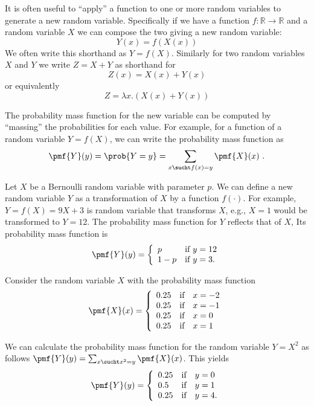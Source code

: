 \begin{flex}
\label{grp:grm:probability::randvar::often}

\begin{gram}
\label{grm:probability::randvar::often}
    It is often useful to ``apply'' a function to one or more random
    variables to generate a new random variable.   Specifically if we
    have a
    function $f : \mathbb{R} \rightarrow \mathbb{R}$ and
    a random variable $X$ we can compose the two giving a new
    random variable:
    \[Y(x) = f(X(x)) \]
    We often write this shorthand as $Y = f(X)$.
    Similarly for two random variables $X$ and $Y$
    we write $Z = X + Y$ as shorthand for 
        \[Z(x) = X(x) + Y(x) \]
    or equivalently
        \[Z = \lambda x . (X(x) + Y(x)) \]

The probability mass function for the new variable can be computed by
``massing'' the probabilities for each value.
For example, for a function of a random variable $Y = f(X)$, we can
write the probability mass function as 
\[
\pmf{Y}(y) = \prob{Y = y} = \sum_{x \sucht f(x) = y}{\pmf{X}(x)}~.
\]

\end{gram}

\begin{example}
\label{xmpl:probability::randvar::bernoulli}
Let $X$ be a Bernoulli random variable with parameter $p$.  We can
define a new random variable $Y$ as a transformation of $X$ by a
function $f(\cdot)$.  For example, $Y = f(X) = 9X + 3$ is random
variable that transforms $X$, e.g., $X = 1$ would be transformed to $Y
= 12$.
The probability mass function for $Y$ reflects that of $X$,
Its probability mass function is 
\[
\pmf{Y}(y) = 
\left\{
\begin{array}{ll}
p & \mbox{if}~y = 12
\\
1-p & \mbox{if}~y = 3.
\end{array}
\right.
\]

\end{example}

\begin{example}
\label{xmpl:probability::randvar::consider}
Consider the random variable $X$ with the probability mass function 
\[
\pmf{X}(x) = 
\left\{
\begin{array}{lll}
0.25  & \mbox{if} & x = -2
\\
0.25  & \mbox{if} & x = -1
\\
0.25  & \mbox{if} & x = 0
\\
0.25  & \mbox{if} & x = 1
\end{array}
\right.
\]

We can calculate the probability mass function for the random variable
$Y = X^2$ as follows $\pmf{Y}(y) = \sum_{x \sucht x^2 =
  y}\pmf{X}(x)$.
This yields
\[
\pmf{Y}(y) = 
\left\{
\begin{array}{lll}
0.25  & \mbox{if} & y = 0
\\
0.5  & \mbox{if} & y = 1
\\
0.25  & \mbox{if} & y = 4.
\end{array}
\right.
\]

\end{example}
\end{flex}


